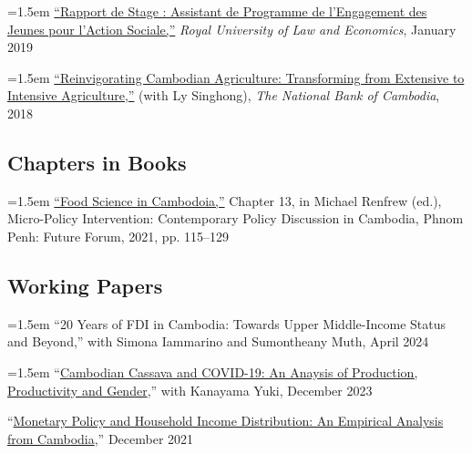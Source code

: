 \documentclass[10pt,a4paper]{article}
\begin{document}
	\hangindent=1.5em
	\href{https://www.researchgate.net/publication/330936932_Rapport_du_Stage_Assistant_de_Programme_a_l%27YRDP}{``Rapport de Stage : Assistant de Programme de l'Engagement des Jeunes pour l'Action Sociale,”} \textit{Royal University of Law and Economics}, January 2019 \\ \vspace{-.5em}
			
	\hangindent=1.5em
	\href{https://ideas.repec.org/p/pra/mprapa/93086.html}{``Reinvigorating Cambodian Agriculture: Transforming from Extensive to Intensive Agriculture,”} (with Ly Singhong), \textit{The National Bank of Cambodia}, 2018 
\subsection*{Chapters in Books}

\hangindent=1.5em
\href{https://kosalnith.github.io/research/policies/PolicyBrief-FST.pdf}{``Food Science in Cambodoia,''} Chapter 13, in Michael Renfrew (ed.), Micro-Policy Intervention: Contemporary Policy Discussion in Cambodia, Phnom Penh: Future Forum, 2021, pp. 115–129 

\subsection*{Working Papers}

		\hangindent=1.5em
	``20 Years of FDI in Cambodia: Towards Upper Middle-Income Status and Beyond,'' with Simona Iammarino and Sumontheany Muth, April 2024 \\ \vspace{-.5em}
	
	\hangindent=1.5em
	“\href{}{Cambodian Cassava and COVID-19: An Anaysis of Production, Productivity and Gender},” with Kanayama Yuki, December 2023\\ \vspace{-.5em}
	
	“\href{https://kosalnith.github.io/research/papers/MPHI.pdf}{Monetary Policy and Household Income Distribution: An Empirical Analysis from Cambodia},” December 2021 
\end{document}
